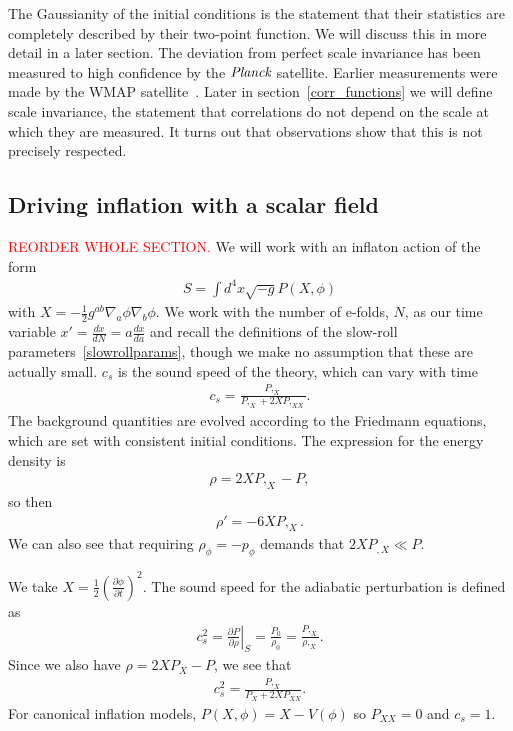     The Gaussianity of the initial conditions is the statement that their statistics are completely described by
    their two-point function. We will discuss this in more detail in a later section.
    The deviation from perfect scale invariance has been measured to high confidence by the $\textit{Planck}$
    satellite.
    Earlier measurements were made by the WMAP satellite~\cite{Senatore_wmap_2009}.
    Later in section~\ref{corr_functions} we will define scale invariance,
    the statement that correlations do not depend on the scale at which they are measured.
    It turns out that observations show that this is not precisely respected.

    \subsection{Driving inflation with a scalar field}
\textcolor{red}{REORDER WHOLE SECTION.}
We will work with an inflaton action of the form
\begin{align}
S = \int d^4x \sqrt{-g}P(X,\phi)
\end{align}
with $X=-\frac{1}{2}g^{ab}\nabla_a \phi\nabla_b \phi$.
We work with the number of e-folds, $N$, as our time variable
$x'=\frac{dx}{dN}=a\frac{dx}{da}$
and recall the definitions of the slow-roll parameters~\eqref{slowrollparams},
though we make no assumption that these are actually small.
$c_s$ is the sound speed of the theory, which can vary with time~\cite{Christopherson_2009}
\begin{align}
c_s=\frac{P,_X}{P,_X+2XP,_{XX}}.
\end{align}
The background quantities are evolved according to the Friedmann equations,
which are set with consistent initial conditions.
The expression for the energy density is~\cite{Christopherson_2009}
\begin{align}
    \rho = 2XP,_X-P,
\end{align}
so then
\begin{align}
    \rho' = -6XP,_X.
\end{align}
We can also see that requiring $\rho_\phi=-p_\phi$ demands that
$2XP_{,X}\ll P$.


    We take $X=\frac{1}{2}\left(\frac{\partial\phi}{\partial t}\right)^2$.
    The sound speed for the adiabatic perturbation is defined as
    \begin{align}\label{sound_speed_definition}
        c_s^2 = \left. \frac{\partial P}{\partial \rho} \right|_S = \frac{\dot{P}_0}{\dot{\rho}_0}
        = \frac{P,_X}{\rho,_X}.
    \end{align}
    Since we also have $\rho=2X P_X-P$, we see that
    \begin{align}
        c_s^2 = \frac{P,_X}{P_X+2X P_{XX}}.
    \end{align}
    For canonical inflation models, $P(X,\phi)=X-V(\phi)$
    so $P_{XX}=0$ and $c_s=1$.


